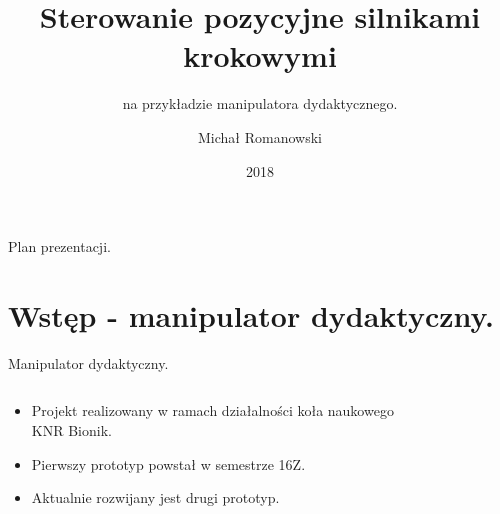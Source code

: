 \documentclass{beamer}
\title[Sterowanie pozycyjne silnikami krokowymi.]{Sterowanie pozycyjne silnikami krokowymi}
\subtitle{na przykładzie manipulatora dydaktycznego.}
\author{Michał Romanowski}
\date{2018}
\begin{document}
\begin{frame}
  \titlepage
\end{frame}

\begin{frame}{Plan prezentacji.}
  \tableofcontents
\end{frame}

\section{Wstęp - manipulator dydaktyczny.}

\begin{frame}{Manipulator dydaktyczny.}
\begin{columns}[T]
	\begin{column}{.5\textwidth}
		\begin{itemize}
		\item {
			Projekt realizowany w ramach działalności koła naukowego KNR Bionik.
		}
		\item {
			Pierwszy prototyp powstał w semestrze 16Z.
		}
		\item {
			Aktualnie rozwijany jest drugi prototyp.	 	
		}
		\end{itemize}
	\end{column}
	\begin{column}{.5\textwidth}
		\begin{figure}%
			\centering
			\qquad

\end{figure}
\end{column}
\end{columns}
\end{frame}
\end{document}
